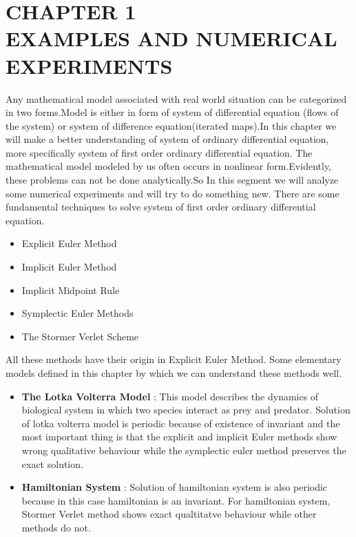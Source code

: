 \documentclass[PhD]{iitmdiss}
\begin{document}
{\chapter{CHAPTER 1\\ EXAMPLES AND NUMERICAL EXPERIMENTS}
Any mathematical model associated with real world situation can be categorized in two forms.Model is either in form of system of differential equation (flows of the system) or system of difference equation(iterated maps).In this chapter we will make a better understanding of system of ordinary differential equation, more specifically system of first order ordinary differential equation. The mathematical model modeled by us often occurs in nonlinear form.Evidently, these problems can not be done analytically.So In this segment we will analyze some numerical experiments and will try to do something new.
There are some fundamental techniques to solve system of first order ordinary differential equation.\\
\begin{itemize}
    \item {Explicit Euler Method}\\
    \item {Implicit Euler Method}\\
    \item {Implicit Midpoint Rule}\\
    \item {Symplectic Euler Methods}\\
    \item {The Stormer Verlet Scheme}\\
\end{itemize}
All these methods have their origin in Explicit Euler Method. Some elementary models  defined in this chapter by which we can understand these methods well.
\begin{itemize}
    \item {\textbf{The Lotka Volterra Model} : This model describes the dynamics of biological system in which two species interact as prey and predator. Solution of lotka volterra model is periodic because of existence of invariant and the most important thing is that the explicit and implicit Euler methods show wrong qualitative behaviour while the symplectic euler method preserves the exact solution.}\\
    \item{\textbf{Hamiltonian System} : Solution of hamiltonian system is also periodic because in this case hamiltonian is an invariant. For hamiltonian system, Stormer Verlet method shows exact qualtitatve\cite{cCivril2008} behaviour while other methods do not.}\\
    

\end{itemize}}
\end{document}
